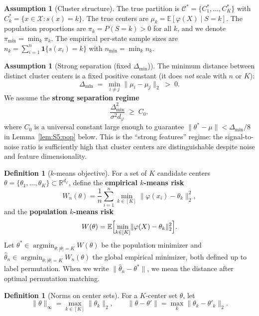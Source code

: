 \documentclass[twoside]{article}
\theoremstyle{plain}
\theoremstyle{definition}
\newtheorem{assumption}[theorem]{Assumption}
\newtheorem{definition}[theorem]{Definition}
\theoremstyle{remark}
\newcommand{\R}{\mathbb{R}}
\newcommand{\E}{\mathbb{E}}
\newcommand{\argmin}{\operatorname{argmin}}
\newcommand{\1}{\mathbf{1}}
\newcommand{\cX}{\mathcal{X}}
\renewcommand{\phi}{\varphi}
\newcommand{\htheta}{\hat{\theta}}
\newcommand{\muk}{\mu_k}
\newcommand{\norm}[1]{\lVert#1\rVert}
\newcommand{\ind}{\mathbf{1}}
\newcommand{\cstar}{\mathcal{C}^*}
\begin{document}
\begin{assumption}[Cluster structure]
\label{ass:S5:cluster}
The true partition is $\cstar=\{C_1^*,\dots,C_K^*\}$ with
$C_k^*=\{x\in\cX: s(x)=k\}$.  The true centers are
$\muk=\E[\phi(X)\mid S=k]$.  The population proportions are
$\pi_k=P(S=k)>0$ for all $k$, and we denote
$\pi_{\min}=\min_k\pi_k$.  The empirical per-state sample sizes are
$n_k=\sum_{i=1}^n\ind\{s(x_i)=k\}$ with $n_{\min}=\min_k n_k$.
\end{assumption}

\begin{assumption}[Strong separation (fixed $\Delta_{\min}$)]
\label{ass:S5:sep}
The minimum distance between distinct cluster centers is a fixed positive
constant (it does \emph{not} scale with $n$ or $K$):
\[
\Delta_{\min} \;=\; \min_{i\neq j}\norm{\mu_i-\mu_j}_2 \;>\;0.
\]
We assume the \textbf{strong separation regime}
\begin{equation}
\frac{\Delta_{\min}^2}{\sigma^2 d_\phi}\;\ge\;C_0,
\label{eq:S5:strongsep}
\end{equation}
where $C_0$ is a universal constant large enough to guarantee
$\norm{\theta^*-\mu}<\Delta_{\min}/8$ in Lemma~\ref{lem:S5:pop} below.
This is the ``strong features'' regime: the signal-to-noise ratio is
sufficiently high that cluster centers are distinguishable despite noise
and feature dimensionality.
\end{assumption}

\begin{definition}[$k$-means objective]
\label{def:S5:kmeans}
For a set of $K$ candidate centers
$\theta=\{\theta_1,\dots,\theta_K\}\subset\R^{d_\phi}$, define the
\textbf{empirical $k$-means risk}
\[
W_n(\theta)=\frac1n\sum_{i=1}^n\min_{k\in[K]}\norm{\phi(x_i)-\theta_k}_2^2,
\]
and the \textbf{population $k$-means risk}
\[
W(\theta)=\E\Bigl[\min_{k\in[K]}\norm{\phi(X)-\theta_k}_2^2\Bigr].
\]
Let
$\theta^*\in\argmin_{\theta:|\theta|=K}W(\theta)$ be the population
minimizer and $\htheta_n\in\argmin_{\theta:|\theta|=K}W_n(\theta)$ the
global empirical minimizer, both defined up to label permutation.
When we write $\norm{\htheta_n-\theta^*}$, we mean the distance after
optimal permutation matching.
\end{definition}

\begin{definition}[Norms on center sets]
For a $K$-center set $\theta$, let
\[
\norm{\theta}_\infty = \max_{k\in[K]}\norm{\theta_k}_2,
\qquad
\norm{\theta-\theta'} = \max_{k}\norm{\theta_k-\theta'_k}_2.
\]
\end{definition}
\end{document}
